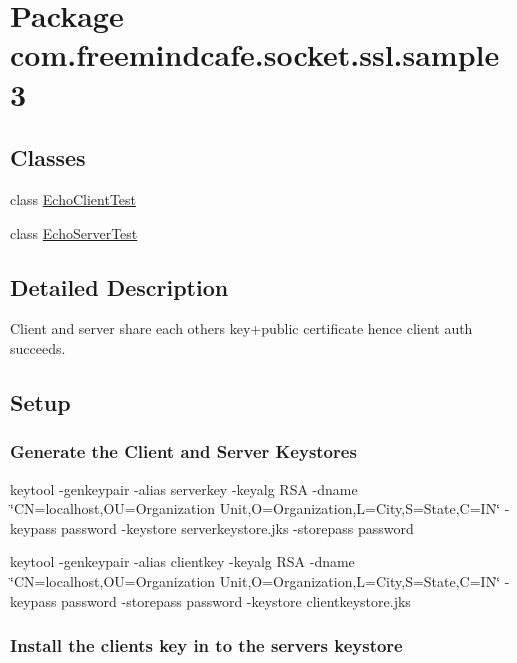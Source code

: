 \hypertarget{namespacecom_1_1freemindcafe_1_1socket_1_1ssl_1_1sample3}{}\section{Package com.\+freemindcafe.\+socket.\+ssl.\+sample3}
\label{namespacecom_1_1freemindcafe_1_1socket_1_1ssl_1_1sample3}
\subsection*{Classes}
\begin{DoxyCompactItemize}
\item 
class \hyperlink{classcom_1_1freemindcafe_1_1socket_1_1ssl_1_1sample3_1_1_echo_client_test}{Echo\+Client\+Test}
\item 
class \hyperlink{classcom_1_1freemindcafe_1_1socket_1_1ssl_1_1sample3_1_1_echo_server_test}{Echo\+Server\+Test}
\end{DoxyCompactItemize}


\subsection{Detailed Description}
Client and server share each others key+public certificate hence client auth succeeds.

\subsection*{Setup}

\subsubsection*{Generate the Client and Server Keystores}


\begin{DoxyItemize}
\item keytool -\/genkeypair -\/alias serverkey -\/keyalg R\+S\+A -\/dname \char`\"{}\+C\+N=localhost,\+O\+U=\+Organization Unit,\+O=\+Organization,\+L=\+City,\+S=\+State,\+C=\+I\+N\char`\"{} -\/keypass password -\/keystore serverkeystore.\+jks -\/storepass password 
\item keytool -\/genkeypair -\/alias clientkey -\/keyalg R\+S\+A -\/dname \char`\"{}\+C\+N=localhost,\+O\+U=\+Organization Unit,\+O=\+Organization,\+L=\+City,\+S=\+State,\+C=\+I\+N\char`\"{} -\/keypass password -\/storepass password -\/keystore clientkeystore.\+jks 
\end{DoxyItemize}\subsubsection*{Install the client\textquotesingle{}s key in to the server\textquotesingle{}s keystore}


